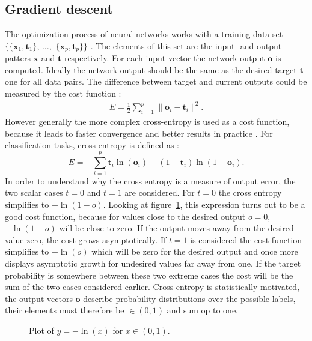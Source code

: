 \subsection{Gradient descent}
The optimization process of neural networks works with a training data set $\{\{\mathbf{x}_1,\mathbf{t}_1\}$, $\dots ,$ $\{\mathbf{x}_p,\mathbf{t}_p\} \}$ \cite[page 156]{Rojas1996}. The elements of this set are the input- and output-patters $\mathbf{x}$ and $\mathbf{t}$ respectively. For each input vector the network output $\mathbf{o}$ is computed. Ideally the network output should be the same as the desired target $\mathbf{t}$ one for all data pairs. The difference between target and current outputs could be measured by the cost function \cite[page 156]{Rojas1996}:
\begin{align}
E = \frac{1}{2}\sum\limits_{i=1}^{p} \| \mathbf{o}_i - \mathbf{t}_i \|^2.
\end{align}
However generally the more complex cross-entropy is used as a cost function, because it leads to faster convergence and better results in practice \cite{Golik2013}. For classification tasks, cross entropy is defined as \cite[page 245]{Bishop1995}:
\begin{equation}
E = - \sum\limits_{i=1}^{p} {\mathbf{t}_i \ln(\mathbf{o}_i)} + (1 - \mathbf{t}_i)\ln(1 - \mathbf{o}_i).
\label{eq:corssEntropy}
\end{equation}
In order to understand why the cross entropy is a measure of output error, the two scalar cases $t=0$ and $t=1$ are considered. For $t = 0$ the cross entropy simplifies to $-\ln(1 - o)$. Looking at figure~\ref{fig:logPlot}, this expression turns out to be a good cost function, because for values close to the desired output $o = 0$, $-\ln(1 - o)$ will be close to zero. If the output moves away from the desired value zero, the cost grows asymptotically. If $t = 1$ is considered the cost function simplifies to $-\ln(o)$ which will be zero for the desired output and once more displays asymptotic growth for undesired values far away from one. If the target probability is somewhere between these two extreme cases the cost will be the sum of the two cases considered earlier. Cross entropy is statistically motivated, the output vectors $\mathbf{o}$ describe probability distributions over the possible labels, their elements must therefore be $\in (0,1)$ and sum op to one.
\begin{figure}
\centering

\caption{Plot of $y = -\ln(x)$ for $x \in (0,1)$.}
\label{fig:logPlot}
\end{figure}

